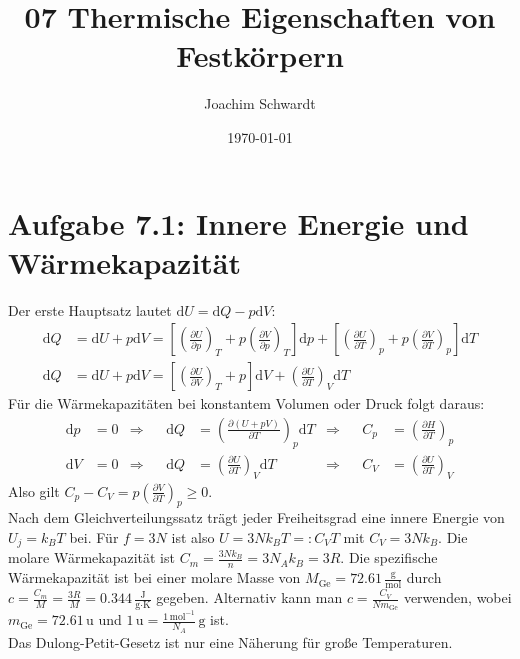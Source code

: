 \documentclass[a4paper,12pt]{article}
\newcommand{\kla}{}
\newcommand{\klam}{}
\newcommand{\tecxt}{}
\begin{document}
\title{07 Thermische Eigenschaften von Festkörpern}
\author{Joachim Schwardt}
\date{\today}
\maketitle

\section*{Aufgabe 7.1: Innere Energie und Wärmekapazität}
Der erste Hauptsatz lautet $\tecxt\text{d}U=\tecxt\text{d}Q-p\tecxt\text{d}V$:
\begin{align*}
\tecxt\text{d}Q&=\tecxt\text{d}U+p\tecxt\text{d}V=\klam\left[ {\kla\left( {\frac{\partial U}{\partial p}} \right)_T+p\kla\left( {\frac{\partial V}{\partial p}} \right)_T} \right]\tecxt\text{d}p+\klam\left[ {\kla\left( {\frac{\partial U}{\partial T}} \right)_p+p\kla\left( {\frac{\partial V}{\partial T}} \right)_p} \right]\tecxt\text{d}T\\
\tecxt\text{d}Q&=\tecxt\text{d}U+p\tecxt\text{d}V=\klam\left[ {\kla\left( {\frac{\partial U}{\partial V}} \right)_T+p} \right]\tecxt\text{d}V+\kla\left( {\frac{\partial U}{\partial T}} \right)_V\tecxt\text{d}T
\end{align*}
Für die Wärmekapazitäten bei konstantem Volumen oder Druck folgt daraus:
\begin{align*}
\tecxt\text{d}p&=0&\Rightarrow &&\tecxt\text{d}Q&=\kla\left( {\frac{\partial (U+pV)}{\partial T}} \right)_p\tecxt\text{d}T&\Rightarrow && C_p&=\kla\left( {\frac{\partial H}{\partial T}} \right)_p\\
\tecxt\text{d}V&=0&\Rightarrow &&\tecxt\text{d}Q&=\kla\left( {\frac{\partial U}{\partial T}} \right)_V\tecxt\text{d}T&\Rightarrow && C_V&=\kla\left( {\frac{\partial U}{\partial T}} \right)_V
\end{align*}
Also gilt $C_p-C_V=p\kla\left( {\frac{\partial V}{\partial T}} \right)_p\ge 0$.\\
Nach dem Gleichverteilungssatz trägt jeder Freiheitsgrad eine innere Energie von $U_j=k_BT$ bei. Für $f=3N$ ist also $U=3Nk_BT=:C_VT$ mit $C_V=3Nk_B$. Die molare Wärmekapazität ist $C_m=\frac{3Nk_B}{n}=3N_Ak_B=3R$. Die spezifische Wärmekapazität ist bei einer molare Masse von $M_\tecxt\text{Ge}=72.61\,\frac{\tecxt\text{g}}{\tecxt\text{mol}}$ durch $c=\frac{C_m}{M}=\frac{3R}{M}=0.344\,\frac{\tecxt\text{J}}{\tecxt\text{g}\cdot\tecxt\text{K}}$ gegeben. Alternativ kann man $c=\frac{C_V}{Nm_\tecxt\text{Ge}}$ verwenden, wobei $m_\tecxt\text{Ge}=72.61\,$u und $1\,\tecxt\text{u}=\frac{1\,\tecxt\text{mol}^{-1}}{N_A}\,\tecxt\text{g}$ ist.\\
Das Dulong-Petit-Gesetz ist nur eine Näherung für große Temperaturen.\newpage
\end{document}
